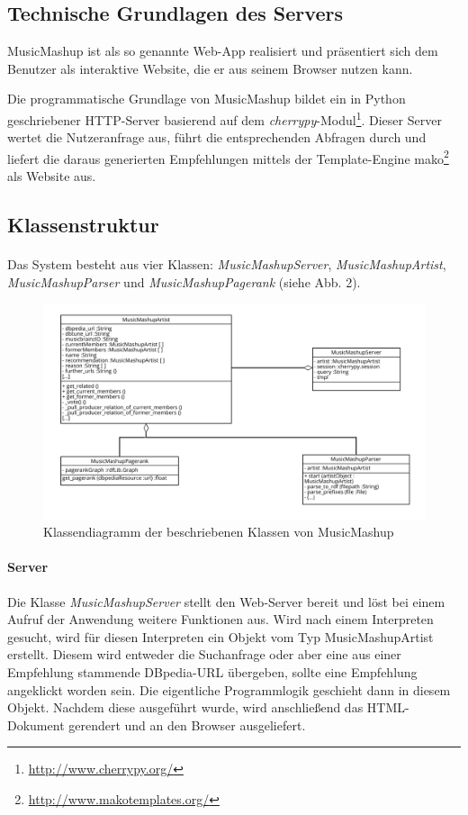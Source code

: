 \subsection{Technische Grundlagen des Servers}

MusicMashup ist als so genannte Web-App realisiert und präsentiert sich dem Benutzer als interaktive Website, die er aus seinem Browser nutzen kann.

Die programmatische Grundlage von MusicMashup bildet ein in Python geschriebener 
HTTP-Server basierend auf dem \textit{cherrypy}-Modul\footnote{\url{http://www.cherrypy.org/}}. Dieser Server wertet die Nutzeranfrage aus, führt die entsprechenden Abfragen durch und liefert die daraus generierten Empfehlungen mittels der Template-Engine mako\footnote{\url{http://www.makotemplates.org/}} als Website aus. 

\subsection{Klassenstruktur}


\paragraph{}Das System besteht aus vier Klassen: \textit{MusicMashupServer}, \textit{MusicMashupArtist}, \textit{MusicMashupParser} und \textit{MusicMashupPagerank} (siehe Abb. 2).


\begin{figure}[ht!]
\centering
\includegraphics[width=137mm]{bilder/klassendiagramm.png}
\caption{Klassendiagramm der beschriebenen Klassen von MusicMashup \label{overflow}}
\end{figure}

\paragraph{Server} Die Klasse \textit{MusicMashupServer} stellt den Web-Server bereit und löst bei einem Aufruf der Anwendung weitere Funktionen aus. Wird nach einem Interpreten gesucht, wird für diesen Interpreten ein Objekt vom Typ MusicMashupArtist erstellt. Diesem wird entweder die Suchanfrage oder aber eine aus einer Empfehlung stammende DBpedia-URL übergeben, sollte eine Empfehlung angeklickt worden sein. Die eigentliche Programmlogik geschieht dann in diesem Objekt. Nachdem diese ausgeführt wurde, wird anschließend das HTML-Dokument gerendert und an den Browser ausgeliefert.


